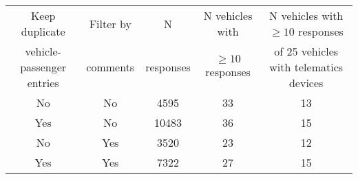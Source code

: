 \begin{tabular}{ccccc} 
\hline 
Keep duplicate            & Filter by & N         & N vehicles with & N vehicles with $\geq 10$ responses \\ 
vehicle-passenger entries & comments  & responses & $\geq 10$ responses & of 25 vehicles with telematics devices \\ 
\hline 
No & No & 4595 & 33 & 13 \\ 
Yes & No & 10483 & 36 & 15 \\ 
No & Yes & 3520 & 23 & 12 \\ 
Yes & Yes & 7322 & 27 & 15 \\ 
\hline 
\end{tabular} 
